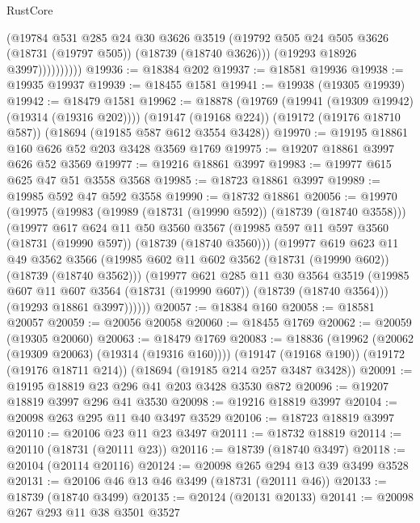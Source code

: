 \begin{lexlean}{RustCore}
\begin{coremodule}
                    (@19784
                      @531
                      @285
                      @24
                      @30
                      @3626
                      @3519
                      (@19792 @505 @24 @505 @3626 (@18731 (@19797 @505)) (@18739 (@18740 @3626)))
                      (@19293 @18926 @3997))))))))))
@19936 := @18384 @202
@19937 := @18581 @19936
@19938 := @19935 @19937
@19939 := @18455 @1581
@19941 := @19938 (@19305 @19939)
@19942 := @18479 @1581
@19962 := @18878
    (@19769 (@19941 (@19309 @19942) (@19314 (@19316 @202))))
    (@19147 (@19168 @224))
    (@19172 (@19176 @18710 @587))
    (@18694 (@19185 @587 @612 @3554 @3428))
@19970 := @19195 @18861 @160 @626 @52 @203 @3428 @3569 @1769
@19975 := @19207 @18861 @3997 @626 @52 @3569
@19977 := @19216 @18861 @3997
@19983 := @19977 @615 @625 @47 @51 @3558 @3568
@19985 := @18723 @18861 @3997
@19989 := @19985 @592 @47 @592 @3558
@19990 := @18732 @18861
@20056 := @19970
    (@19975
      (@19983
        (@19989 (@18731 (@19990 @592)) (@18739 (@18740 @3558)))
        (@19977
          @617
          @624
          @11
          @50
          @3560
          @3567
          (@19985 @597 @11 @597 @3560 (@18731 (@19990 @597)) (@18739 (@18740 @3560)))
          (@19977
            @619
            @623
            @11
            @49
            @3562
            @3566
            (@19985 @602 @11 @602 @3562 (@18731 (@19990 @602)) (@18739 (@18740 @3562)))
            (@19977
              @621
              @285
              @11
              @30
              @3564
              @3519
              (@19985 @607 @11 @607 @3564 (@18731 (@19990 @607)) (@18739 (@18740 @3564)))
              (@19293 @18861 @3997))))))
@20057 := @18384 @160
@20058 := @18581 @20057
@20059 := @20056 @20058
@20060 := @18455 @1769
@20062 := @20059 (@19305 @20060)
@20063 := @18479 @1769
@20083 := @18836
    (@19962 (@20062 (@19309 @20063) (@19314 (@19316 @160))))
    (@19147 (@19168 @190))
    (@19172 (@19176 @18711 @214))
    (@18694 (@19185 @214 @257 @3487 @3428))
@20091 := @19195 @18819 @23 @296 @41 @203 @3428 @3530 @872
@20096 := @19207 @18819 @3997 @296 @41 @3530
@20098 := @19216 @18819 @3997
@20104 := @20098 @263 @295 @11 @40 @3497 @3529
@20106 := @18723 @18819 @3997
@20110 := @20106 @23 @11 @23 @3497
@20111 := @18732 @18819
@20114 := @20110 (@18731 (@20111 @23))
@20116 := @18739 (@18740 @3497)
@20118 := @20104 (@20114 @20116)
@20124 := @20098 @265 @294 @13 @39 @3499 @3528
@20131 := @20106 @46 @13 @46 @3499 (@18731 (@20111 @46))
@20133 := @18739 (@18740 @3499)
@20135 := @20124 (@20131 @20133)
@20141 := @20098 @267 @293 @11 @38 @3501 @3527

\end{coremodule}
\end{lexlean}
